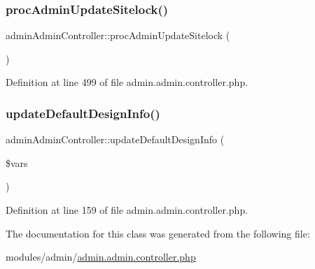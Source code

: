 \subsubsection{\texorpdfstring{proc\+Admin\+Update\+Sitelock()}{procAdminUpdateSitelock()}}
{\footnotesize\ttfamily admin\+Admin\+Controller\+::proc\+Admin\+Update\+Sitelock (\begin{DoxyParamCaption}{ }\end{DoxyParamCaption})}



Definition at line 499 of file admin.\+admin.\+controller.\+php.

\hypertarget{classadminAdminController_ab0f984cd55d52455a818323404efb974}{}\label{classadminAdminController_ab0f984cd55d52455a818323404efb974} 
\subsubsection{\texorpdfstring{update\+Default\+Design\+Info()}{updateDefaultDesignInfo()}}
{\footnotesize\ttfamily admin\+Admin\+Controller\+::update\+Default\+Design\+Info (\begin{DoxyParamCaption}\item[{}]{\$vars }\end{DoxyParamCaption})}



Definition at line 159 of file admin.\+admin.\+controller.\+php.



The documentation for this class was generated from the following file\+:\begin{DoxyCompactItemize}
\item 
modules/admin/\hyperlink{admin_8admin_8controller_8php}{admin.\+admin.\+controller.\+php}\end{DoxyCompactItemize}
